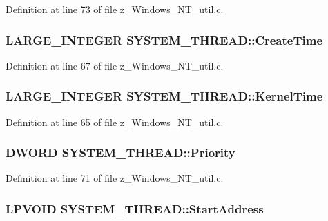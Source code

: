 Definition at line 73 of file z\-\_\-\-Windows\-\_\-\-N\-T\-\_\-util.\-c.

\hypertarget{structSYSTEM__THREAD_adcf5aa5b87a05efdae50ecf5109a3357}{
\subsubsection[{Create\-Time}]{\setlength{\rightskip}{0pt plus 5cm}L\-A\-R\-G\-E\-\_\-\-I\-N\-T\-E\-G\-E\-R S\-Y\-S\-T\-E\-M\-\_\-\-T\-H\-R\-E\-A\-D\-::\-Create\-Time}}\label{structSYSTEM__THREAD_adcf5aa5b87a05efdae50ecf5109a3357}


Definition at line 67 of file z\-\_\-\-Windows\-\_\-\-N\-T\-\_\-util.\-c.

\hypertarget{structSYSTEM__THREAD_ad7375c33040d6ddb6571c3af81435b77}{
\subsubsection[{Kernel\-Time}]{\setlength{\rightskip}{0pt plus 5cm}L\-A\-R\-G\-E\-\_\-\-I\-N\-T\-E\-G\-E\-R S\-Y\-S\-T\-E\-M\-\_\-\-T\-H\-R\-E\-A\-D\-::\-Kernel\-Time}}\label{structSYSTEM__THREAD_ad7375c33040d6ddb6571c3af81435b77}


Definition at line 65 of file z\-\_\-\-Windows\-\_\-\-N\-T\-\_\-util.\-c.

\hypertarget{structSYSTEM__THREAD_a5f52ff03bd023ee94543184b9ff098b2}{
\subsubsection[{Priority}]{\setlength{\rightskip}{0pt plus 5cm}D\-W\-O\-R\-D S\-Y\-S\-T\-E\-M\-\_\-\-T\-H\-R\-E\-A\-D\-::\-Priority}}\label{structSYSTEM__THREAD_a5f52ff03bd023ee94543184b9ff098b2}


Definition at line 71 of file z\-\_\-\-Windows\-\_\-\-N\-T\-\_\-util.\-c.

\hypertarget{structSYSTEM__THREAD_a30ad044660735115374fc57eceef20a0}{
\subsubsection[{Start\-Address}]{\setlength{\rightskip}{0pt plus 5cm}L\-P\-V\-O\-I\-D S\-Y\-S\-T\-E\-M\-\_\-\-T\-H\-R\-E\-A\-D\-::\-Start\-Address}}\label{structSYSTEM__THREAD_a30ad044660735115374fc57eceef20a0}


